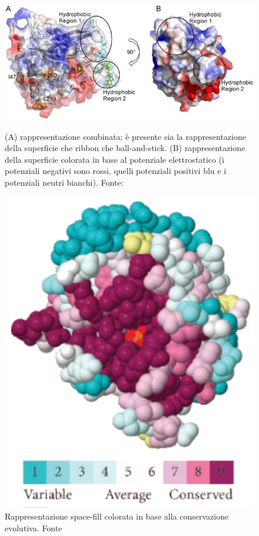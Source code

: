 \begin{figure}[!htb]
	\centering
	\includegraphics[scale=2]{images/combinata-ecc.jpg}
	\caption{(A) rappresentazione combinata; è presente sia la rappresentazione della superficie che ribbon che ball-and-stick. (B) rappresentazione della superficie colorata in base al potenziale elettrostatico (i potenziali negativi sono rossi, quelli potenziali positivi blu e i potenziali neutri bianchi). Fonte: \cite{castaldo2013soluble}}
	\label{fig:rappresentazione-combinata}
	\endminipage\hfill
	\centering
	\includegraphics[scale=0.35]{images/conservazione.png}
	\caption{Rappresentazione space-fill colorata in base alla conservazione evolutiva. Fonte \cite{kessel_ben-tal_2018}}
	\label{fig:rappresentazione-evolutiva}
	\endminipage\hfill
\end{figure}

